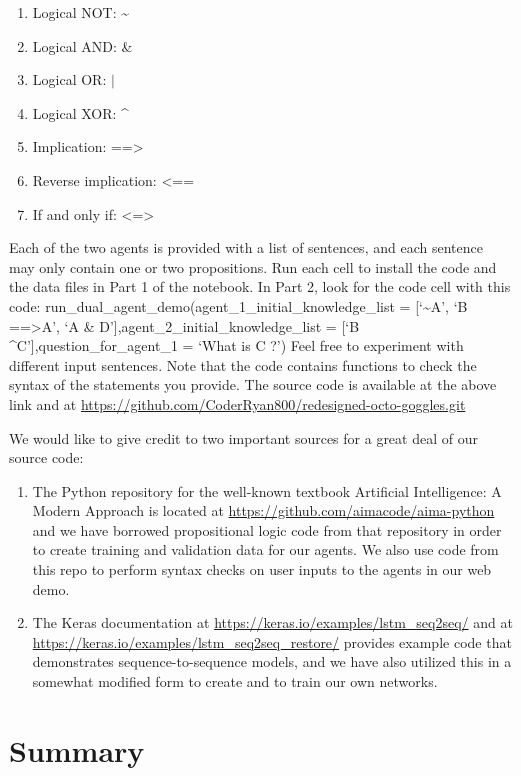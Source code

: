 \documentclass{article}
\begin{document}
\begin{enumerate}
	\item Logical NOT: \textasciitilde
	\item Logical AND: \&
	\item Logical OR: $|$
	\item Logical XOR: \textasciicircum
	\item Implication: ==\textgreater
	\item Reverse implication: \textless==
	\item If and only if: \textless=\textgreater
\end{enumerate}

Each of the two agents is provided with a list of sentences, and each sentence may only contain one or two propositions. Run each cell to install the code and the data files in Part 1 of the notebook. In Part 2, look for the code cell with this code:
run\_dual\_agent\_demo(agent\_1\_initial\_knowledge\_list = [‘\textasciitilde A’, ‘B ==\textgreater A’, ‘A \& D’],agent\_2\_initial\_knowledge\_list = [‘B \textasciicircum C’],question\_for\_agent\_1 = ‘What is C ?’)
Feel free to experiment with different input sentences. Note that the code contains functions to check the syntax of the statements you provide.
The source code is available at the above link and at \url{https://github.com/CoderRyan800/redesigned-octo-goggles.git}

We would like to give credit to two important sources for a great deal of our source code:
\begin{enumerate}
	\item The Python repository for the well-known textbook Artificial Intelligence: A Modern Approach is located at \url{https://github.com/aimacode/aima-python} and we have borrowed propositional logic code from that repository in order to create training and validation data for our agents. We also use code from this repo to perform syntax checks on user inputs to the agents in our web demo.
	\item The Keras documentation at \url{https://keras.io/examples/lstm_seq2seq/} and at \url{https://keras.io/examples/lstm_seq2seq_restore/} provides example code that demonstrates sequence-to-sequence models, and we have also utilized this in a somewhat modified form to create and to train our own networks.
\end{enumerate}

\section{Summary}
\end{document}
